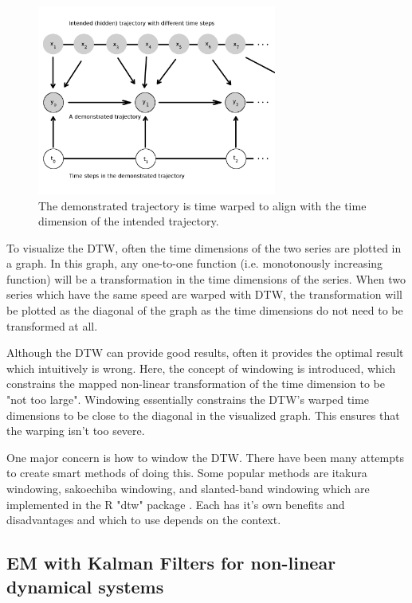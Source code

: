 \documentclass[hidelinks,BTech]{iitmdiss}
\begin{document}
\begin{figure}[H]
  \centering
    \includegraphics[width=0.7\textwidth]{timewarp.png}
    \caption{The demonstrated trajectory is time warped to align with the time dimension of the intended trajectory.}
\end{figure}

To visualize the DTW, often the time dimensions of the two series are plotted in a graph. In this graph, any one-to-one function (i.e. monotonously increasing function) will be a transformation in the time dimensions of the series. When two series which have the same speed are warped with DTW, the transformation will be plotted as the diagonal of the graph as the time dimensions do not need to be transformed at all.

Although the DTW can provide good results, often it provides the optimal result which intuitively is wrong. Here, the concept of windowing is introduced, which constrains the mapped non-linear transformation of the time dimension to be "not too large". Windowing essentially constrains the DTW's warped time dimensions to be close to the diagonal in the visualized graph. This ensures that the warping isn't too severe.

One major concern is how to window the DTW. There have been many attempts to create smart methods of doing this. Some popular methods are itakura windowing, sakoechiba windowing, and slanted-band windowing which are implemented in the R "dtw" package \cite{RDTWPackage}. Each has it's own benefits and disadvantages and which to use depends on the context.

\subsection{EM with Kalman Filters for non-linear dynamical systems}
\end{document}
